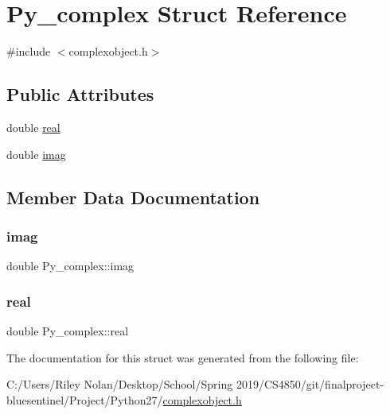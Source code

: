 \hypertarget{struct_py__complex}{}\section{Py\+\_\+complex Struct Reference}
\label{struct_py__complex}


{\ttfamily \#include $<$complexobject.\+h$>$}

\subsection*{Public Attributes}
\begin{DoxyCompactItemize}
\item 
double \mbox{\hyperlink{struct_py__complex_aac636cf827db042e0e9dd8737a669ad3}{real}}
\item 
double \mbox{\hyperlink{struct_py__complex_ac526cca68a8fab49c976359998e44d92}{imag}}
\end{DoxyCompactItemize}


\subsection{Member Data Documentation}
\mbox{\label{struct_py__complex_ac526cca68a8fab49c976359998e44d92}} 
\subsubsection{\texorpdfstring{imag}{imag}}
{\footnotesize\ttfamily double Py\+\_\+complex\+::imag}

\mbox{\label{struct_py__complex_aac636cf827db042e0e9dd8737a669ad3}} 
\subsubsection{\texorpdfstring{real}{real}}
{\footnotesize\ttfamily double Py\+\_\+complex\+::real}



The documentation for this struct was generated from the following file\+:\begin{DoxyCompactItemize}
\item 
C\+:/\+Users/\+Riley Nolan/\+Desktop/\+School/\+Spring 2019/\+C\+S4850/git/finalproject-\/bluesentinel/\+Project/\+Python27/\mbox{\hyperlink{complexobject_8h}{complexobject.\+h}}\end{DoxyCompactItemize}

